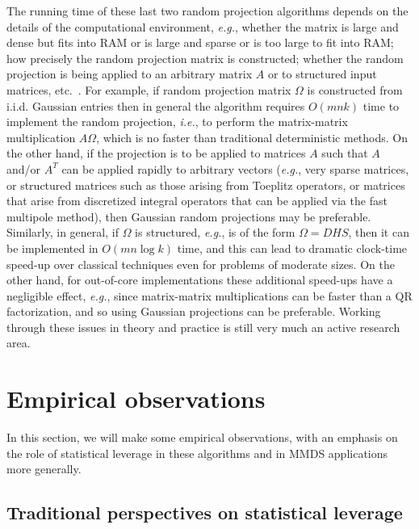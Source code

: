 \documentclass[twoside]{article}
\begin{document}
The running time of these last two random projection algorithms depends on 
the details of the computational environment, \emph{e.g.}, whether the 
matrix is large and dense but fits into RAM or is large and sparse or is too 
large to fit into RAM; how precisely the random projection matrix is 
constructed; whether the random projection is being applied to an arbitrary 
matrix $A$ or to structured input matrices, etc.~\cite{HMT09_SIREV}.
For example, if random projection matrix $\Omega$ is constructed from i.i.d.
Gaussian entries then in general the algorithm requires $O(mnk)$ time to 
implement the random projection, \emph{i.e.}, to perform the matrix-matrix 
multiplication $A\Omega$, which is no faster than traditional deterministic 
methods.
On the other hand, if the projection is to be applied to matrices $A$
such that $A$ and/or $A^T$ can be applied rapidly to arbitrary vectors
(\emph{e.g.}, very sparse matrices, or structured matrices such as those 
arising from Toeplitz operators, or matrices that arise from discretized 
integral operators that can be applied via the fast multipole method), 
then Gaussian random projections may be preferable.
Similarly, in general, if $\Omega$ is structured, \emph{e.g.}, is of the 
form $\Omega = DHS$, then it can be implemented in $O(mn \log k)$ time, and
this can lead to dramatic clock-time speed-up over classical techniques even 
for problems of moderate sizes.
On the other hand, for out-of-core implementations these additional speed-ups 
have a negligible effect, \emph{e.g.}, since matrix-matrix multiplications 
can be faster than a QR factorization, and so using Gaussian projections can 
be preferable.
Working through these issues in theory and practice is still very much an 
active research area.



 \section{Empirical observations}
\label{sxn:empirical}

In this section, we will make some empirical observations, with an emphasis
on the role of statistical leverage in these algorithms and in MMDS 
applications more generally.

\subsection{Traditional perspectives on statistical leverage} 
\label{sxn:empirical-traditional}
\end{document}
